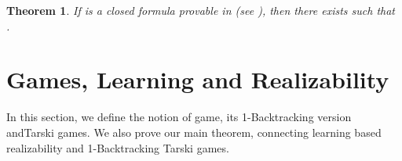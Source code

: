 \documentclass[copyright,creativecommons]{eptcs}
\newtheorem{theorem}{Theorem}
\begin{document}
\begin{theorem}\label{Realizability Theorem}
If  is a closed formula provable in  (see \cite{Aschieri}), then there
exists  such that .
\end{theorem}



\section{Games, Learning and Realizability}\label{gamesrealizability}
\label{section-GamesLearningandRealizability}

In this section, we define the notion of game, its 1-Backtracking version andTarski games. We also prove our main theorem, connecting learning based realizability and 1-Backtracking Tarski games. 
\end{document}
